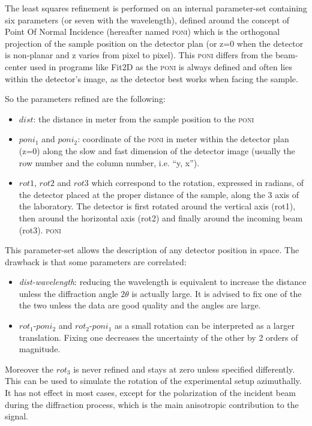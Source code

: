 \documentclass[preprint, pdf]{iucr}              %
\begin{document}
The least squares refinement is performed on an internal parameter-set
containing six  parameters (or seven with the wavelength), defined around the
concept of Point Of Normal Incidence (hereafter named \textsc{poni}) which is
the orthogonal projection  of the sample position on the detector plan 
(or z=0 when the detector is non-planar and z varies from pixel to pixel).
This \textsc{poni} differs from the beam-center used in programs like
Fit2D \cite{fit2d} as the \textsc{poni} is always defined and often lies within
the detector's image, as the detector best works when facing the sample.

So the parameters refined are the following:
\begin{itemize}
  \item $dist$: the distance in meter from the sample position to the
  \textsc{poni}
  \item $poni_1$ and $poni_2$: coordinate of the
  \textsc{poni} in meter within the detector plan (z=0) along the slow and fast
  dimension of the detector image (usually the row number and the column
  number, i.e. ``y, x'').
  \item $rot1$, $rot2$ and $rot3$ which correspond to the
  rotation, expressed in radians, of the detector placed at the proper
  distance of the sample, along the 3 axis of the laboratory. The detector is
  first rotated around the vertical axis (rot1), then around the horizontal axis
  (rot2) and finally around the incoming beam (rot3). 
  \textsc{poni}
\end{itemize}

This parameter-set allows the description of any detector position in space.
The drawback is that some parameters are correlated: 
\begin{itemize}
  \item \textit{dist-wavelength}: reducing the wavelength is equivalent to
  increase the distance unless the diffraction angle $2\theta$ is actually
  large. It is advised to fix one of the the two unless the data are good
  quality and the angles are large.
  \item $rot_1$-$poni_2$ and $rot_2$-$poni_1$ as a small rotation can be
  interpreted as a larger translation. Fixing one decreases the uncertainty of
  the other by 2 orders of magnitude.
\end{itemize}

Moreover the $rot_3$ is never refined and stays at zero unless specified
differently.  This can be used to simulate the rotation of the
experimental setup azimuthally. 
It has not effect in most cases, except for the
polarization of the incident beam during the diffraction process, which is the
main anisotropic contribution to the signal.
\end{document}
